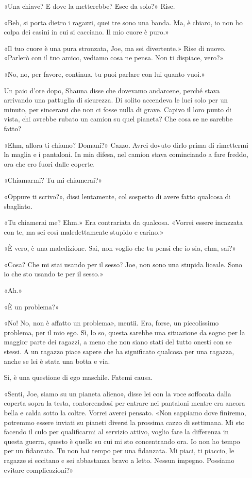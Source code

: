 «Una chiave? E dove la metterebbe? Esce da solo?» Rise.

«Beh, si porta dietro i ragazzi, quei tre sono una banda. Ma, è chiaro,
io non ho colpa dei casini in cui si cacciano. Il mio cuore è puro.»

«Il tuo cuore è una pura stronzata, Joe, ma sei divertente.» Rise di
nuovo. «Parlerò con il tuo amico, vediamo cosa ne pensa. Non ti
dispiace, vero?»

«No, no, per favore, continua, tu puoi parlare con lui quanto vuoi.»

\hfill\break

Un paio d'ore dopo, Shauna disse che dovevamo andarcene, perché stava
arrivando una pattuglia di sicurezza. Di solito accendeva le luci solo
per un minuto, per sincerarsi che non ci fosse nulla di grave. Capivo il
loro punto di vista, chi avrebbe rubato un camion su quel pianeta? Che
cosa se ne sarebbe fatto?

«Ehm, allora ti chiamo? Domani?» Cazzo. Avrei dovuto dirlo prima di
rimettermi la maglia e i pantaloni. In mia difesa, nel camion stava
cominciando a fare freddo, ora che ero fuori dalle coperte.

«Chiamarmi? Tu mi chiamerai?»

«Oppure ti scrivo?», dissi lentamente, col sospetto di avere fatto
qualcosa di sbagliato.

«Tu chiamerai me? Ehm.» Era contrariata da qualcosa. «Vorrei essere
incazzata con te, ma sei così maledettamente stupido e carino.»

«È vero, è una maledizione. Sai, non voglio che tu pensi che io sia,
ehm, sai?»

«Cosa? Che mi stai usando per il sesso? Joe, non sono una stupida
liceale. Sono io che sto usando te per il sesso.»

«Ah.»

«È un problema?»

«No! No, non è affatto un problema», mentii. Era, forse, un piccolissimo
problema, per il mio ego. Sì, lo so, questa sarebbe una situazione da
sogno per la maggior parte dei ragazzi, a meno che non siano stati del
tutto onesti con se stessi. A un ragazzo piace sapere che ha significato
qualcosa per una ragazza, anche se lei è stata una botta e via.

Sì, è una questione di ego maschile. Fatemi causa.

«Senti, Joe, siamo su un pianeta alieno», disse lei con la voce
soffocata dalla coperta sopra la testa, contorcendosi per entrare nei
pantaloni mentre era ancora bella e calda sotto la coltre. Vorrei averci
pensato. «Non sappiamo dove finiremo, potremmo essere inviati su pianeti
diversi la prossima cazzo di settimana. Mi sto facendo il culo per
qualificarmi al servizio attivo, voglio fare la differenza in questa
guerra, questo è quello su cui mi sto concentrando ora. Io non ho tempo
per un fidanzato. Tu non hai tempo per una fidanzata. Mi piaci, ti
piaccio, le ragazze si eccitano e sei abbastanza bravo a letto. Nessun
impegno. Possiamo evitare complicazioni?»


